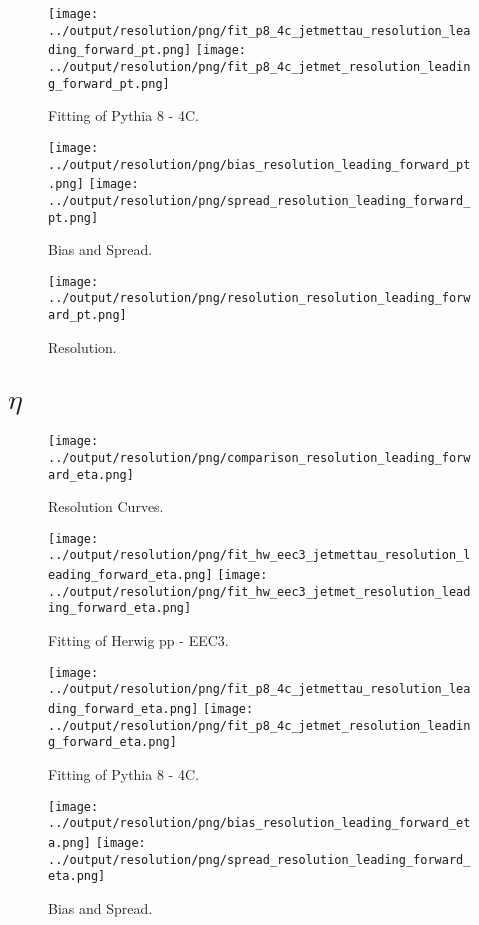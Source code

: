 \documentclass[11pt]{book}
\begin{document}
\begin{figure}[ht]
\centering
\texttt{[image: ../output/resolution/png/fit\_p8\_4c\_jetmettau\_resolution\_leading\_forward\_pt.png]}
\texttt{[image: ../output/resolution/png/fit\_p8\_4c\_jetmet\_resolution\_leading\_forward\_pt.png]}
\caption{Fitting of Pythia 8 - 4C.}
\end{figure}

\begin{figure}[ht]
\centering
\texttt{[image: ../output/resolution/png/bias\_resolution\_leading\_forward\_pt.png]}
\texttt{[image: ../output/resolution/png/spread\_resolution\_leading\_forward\_pt.png]}
\caption{Bias and Spread.}
\end{figure}


\begin{figure}[ht]
\centering
\texttt{[image: ../output/resolution/png/resolution\_resolution\_leading\_forward\_pt.png]}
\caption{Resolution.}
\end{figure}
\clearpage

\section{$\eta$}

\begin{figure}[ht]
\centering
\texttt{[image: ../output/resolution/png/comparison\_resolution\_leading\_forward\_eta.png]}
\caption{Resolution Curves.}
\end{figure}


\begin{figure}[ht]
\centering
\texttt{[image: ../output/resolution/png/fit\_hw\_eec3\_jetmettau\_resolution\_leading\_forward\_eta.png]}
\texttt{[image: ../output/resolution/png/fit\_hw\_eec3\_jetmet\_resolution\_leading\_forward\_eta.png]}
\caption{Fitting of Herwig pp - EEC3.}
\end{figure}

\begin{figure}[ht]
\centering
\texttt{[image: ../output/resolution/png/fit\_p8\_4c\_jetmettau\_resolution\_leading\_forward\_eta.png]}
\texttt{[image: ../output/resolution/png/fit\_p8\_4c\_jetmet\_resolution\_leading\_forward\_eta.png]}
\caption{Fitting of Pythia 8 - 4C.}
\end{figure}

\begin{figure}[ht]
\centering
\texttt{[image: ../output/resolution/png/bias\_resolution\_leading\_forward\_eta.png]}
\texttt{[image: ../output/resolution/png/spread\_resolution\_leading\_forward\_eta.png]}
\caption{Bias and Spread.}
\end{figure}
\end{document}
